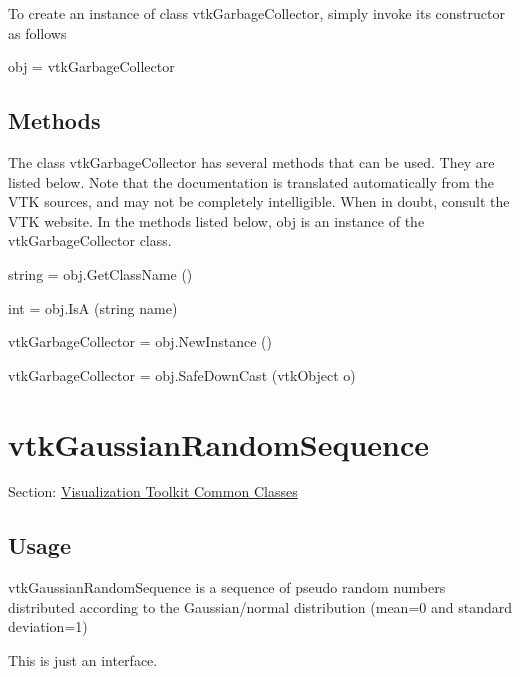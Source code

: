 To create an instance of class vtk\-Garbage\-Collector, simply invoke its constructor as follows \begin{DoxyVerb}  obj = vtkGarbageCollector
\end{DoxyVerb}
 \hypertarget{vtkwidgets_vtkxyplotwidget_Methods}{}\subsection{Methods}\label{vtkwidgets_vtkxyplotwidget_Methods}
The class vtk\-Garbage\-Collector has several methods that can be used. They are listed below. Note that the documentation is translated automatically from the V\-T\-K sources, and may not be completely intelligible. When in doubt, consult the V\-T\-K website. In the methods listed below, {\ttfamily obj} is an instance of the vtk\-Garbage\-Collector class. 
\begin{DoxyItemize}
\item {\ttfamily string = obj.\-Get\-Class\-Name ()}  
\item {\ttfamily int = obj.\-Is\-A (string name)}  
\item {\ttfamily vtk\-Garbage\-Collector = obj.\-New\-Instance ()}  
\item {\ttfamily vtk\-Garbage\-Collector = obj.\-Safe\-Down\-Cast (vtk\-Object o)}  
\end{DoxyItemize}\hypertarget{vtkcommon_vtkgaussianrandomsequence}{}\section{vtk\-Gaussian\-Random\-Sequence}\label{vtkcommon_vtkgaussianrandomsequence}
Section\-: \hyperlink{sec_vtkcommon}{Visualization Toolkit Common Classes} \hypertarget{vtkwidgets_vtkxyplotwidget_Usage}{}\subsection{Usage}\label{vtkwidgets_vtkxyplotwidget_Usage}
vtk\-Gaussian\-Random\-Sequence is a sequence of pseudo random numbers distributed according to the Gaussian/normal distribution (mean=0 and standard deviation=1)

This is just an interface.

